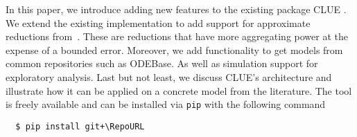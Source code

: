 In this paper, we introduce \ToolName adding new features to the existing package CLUE \cite{ovchinnikov_clue_2021,jimenez_clue_2022}.
We extend the existing implementation to add support for approximate reductions from~\cite{leguizamon-robayo_approximate_2023}.
These are reductions that have more aggregating power at the expense of a bounded error\cite{leguizamon-robayo_approximate_2023}. 
Moreover, we add functionality to get models from common repositories such as ODEBase\cite{LuedersSturmRadulescu22}. 
As well as simulation support for exploratory analysis.
Last but not least, we discuss CLUE's architecture and illustrate how it can be applied on a concrete model from the literature.
The tool is freely available and can be installed via \texttt{pip} with the following command
\begin{verbatim}
  $ pip install git+\RepoURL
\end{verbatim}









